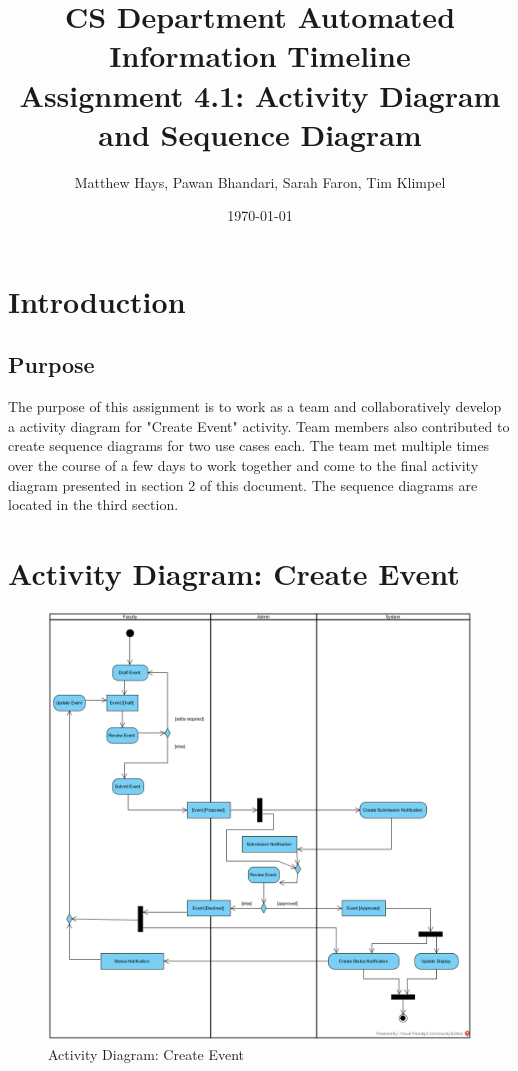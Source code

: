 \documentclass{article}
\title{CS Department Automated Information Timeline \\ Assignment 4.1: Activity Diagram and Sequence Diagram}
\date{\today}
\author{Matthew Hays, Pawan Bhandari, Sarah Faron, Tim Klimpel}
\begin{document}
\maketitle
\newpage
\tableofcontents
\listoffigures
\newpage

\section{Introduction}
\subsection{Purpose}
The purpose of this assignment is to work as a team and collaboratively develop a activity diagram for "Create Event" activity. Team members also contributed to create sequence diagrams for two use cases each. The team met multiple times over the course of a few days to work together and come to the final activity diagram presented in section 2 of this document. The sequence diagrams are located in the third section.

\section{Activity Diagram: Create Event}
\begin{figure}[H]
    \centering
    \includegraphics[width=.98\textwidth]{images/activityDiagram-CreateEvent.png}
    \centering
    \caption{Activity Diagram: Create Event}
    \label{fig:activityDiagram}
\end{figure}
\end{document}
